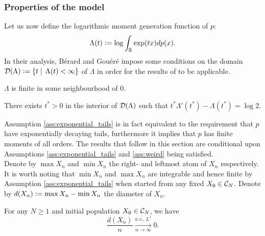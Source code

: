 \subsubsection{Properties of the model}

Let us now define the logarithmic moment generation function of $p$:
\begin{equation*}
\Lambda(t) \defeq \log \int_\R \exp(tx) dp(x). 
\end{equation*}
In their analysis, Bérard and Gouéré impose some conditions on the domain $\cal{D}(\Lambda) \defeq \{t \mid\, \Lambda(t) < \infty \}$ of $\Lambda$ in order for the results of \cite{gantert2008asymptotics} to be applicable. 
\begin{assumption}\label{ass:exponential_tails}
$\Lambda$ is finite in some neighbourhood of $0$. 
\end{assumption}
\begin{assumption}\label{ass:weird}
There exists $t^* > 0$ in the interior of $\cal{D}(\Lambda)$ such that $t^*\Lambda'(t^*) - \Lambda(t^*) = \log 2$. 
\end{assumption}

Assumption \ref{ass:exponential_tails} is in fact equivalent to the requirement that $p$ have exponentially decaying tails, furthermore it implies that $p$ has finite moments of all orders. The results that follow in this section are conditional upon Assumptions \ref{ass:exponential_tails} and \ref{ass:weird} being satisfied. \\

Denote by $\max X_n$ and $\min X_n$ the right- and leftmost atom of $X_n$ respectively. It is worth noting that $\min X_n$ and $\max X_n$ are integrable and hence finite by Assumption \ref{ass:exponential_tails} when started from any fixed $X_0 \in \cal{C}_N$. Denote by $d(X_n) \defeq \max X_n - \min X_n$ the diameter of $X_n$. 

\begin{proposition}\label{prop:diameter}
For any $N \geq 1$ and initial population $X_0 \in \cal{C}_N$, we have 
\begin{equation*}
\frac{d(X_n)}{n} \xrightarrow[n \to \infty]{a.s.,\, L^1} 0. 
\end{equation*}
\end{proposition}

